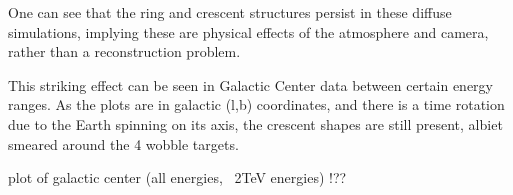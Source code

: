 One can see that the ring and crescent structures persist in these diffuse simulations, implying these are physical effects of the atmosphere and camera, rather than a reconstruction problem.

This striking effect can be seen in Galactic Center data between certain energy ranges.
As the plots are in galactic (l,b) coordinates, and there is a time rotation due to the Earth spinning on its axis, the crescent shapes are still present, albiet smeared around the 4 wobble targets.

plot of galactic center (all energies, ~2TeV energies) !??




